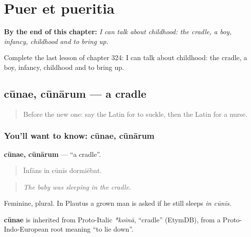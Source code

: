 
\chapter{Puer et pueritia}
\label{ch:la-puer-et-pueritia}

\begin{chapteropening}
\textbf{By the end of this chapter:} \emph{I can talk about childhood: the cradle, a boy, infancy, childhood and to bring up.}

Complete the last lesson of chapter 324: I can talk about childhood: the cradle, a boy, infancy, childhood and to bring up.
\end{chapteropening}

\section[cūnae, cūnārum]{cūnae, cūnārum — a cradle}

\label{lesson:LA-C324-cunae}



\begin{quote}
Before the new one: say the Latin for to suckle, then the Latin for a nurse.
\end{quote}

\subsection*{You'll want to know: cūnae, cūnārum}
\textbf{cūnae, cūnārum} — \textquotedblleft{}a cradle\textquotedblright{}.

\begin{quote}
Īnfāns in cūnīs dormiēbat.
\end{quote}

\begin{quote}
\emph{The baby was sleeping in the cradle.}
\end{quote}

Feminine, plural. In Plautus a grown man is asked if he still sleeps \emph{in cūnīs}.

\begin{cousinweb}
\textbf{cūnae} is inherited from Proto-Italic \emph{*koinā}, \textquotedblleft{}cradle\textquotedblright{} (EtymDB), from a Proto-Indo-European root meaning \textquotedblleft{}to lie down\textquotedblright{}.
\end{cousinweb}

